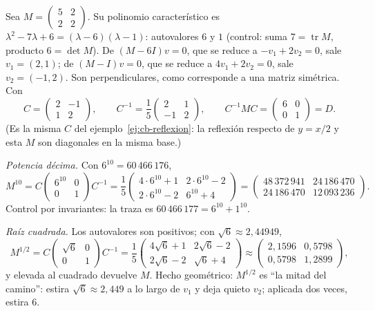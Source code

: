 \begin{ejemplo}\label{ej:cb-diagonalizar}
Sea \(M=\begin{pmatrix}5&2\\2&2\end{pmatrix}\). Su polinomio característico es
\(\lambda^2-7\lambda+6=(\lambda-6)(\lambda-1)\): autovalores \(6\) y \(1\) (control: suma
\(7=\operatorname{tr}M\), producto \(6=\det M\)). De \((M-6I)v=0\), que se reduce a
\(-v_1+2v_2=0\), sale \(v_1=(2,1)\); de \((M-I)v=0\), que se reduce a \(4v_1+2v_2=0\), sale
\(v_2=(-1,2)\). Son perpendiculares, como corresponde a una matriz simétrica. Con
\[
  C=\begin{pmatrix}2&-1\\1&2\end{pmatrix},\qquad
  C^{-1}=\frac15\begin{pmatrix}2&1\\-1&2\end{pmatrix},\qquad
  C^{-1}MC=\begin{pmatrix}6&0\\0&1\end{pmatrix}=D .
\]
(Es la misma \(C\) del ejemplo~\ref{ej:cb-reflexion}: la reflexión respecto de
\(y=x/2\) y esta \(M\) son diagonales en la misma base.)

\emph{Potencia décima.} Con \(6^{10}=60\,466\,176\),
\[
  M^{10}=C\begin{pmatrix}6^{10}&0\\0&1\end{pmatrix}C^{-1}
  =\frac15\begin{pmatrix}4\cdot6^{10}+1&2\cdot6^{10}-2\\2\cdot6^{10}-2&6^{10}+4\end{pmatrix}
  =\begin{pmatrix}48\,372\,941&24\,186\,470\\24\,186\,470&12\,093\,236\end{pmatrix}.
\]
Control por invariantes: la traza es \(60\,466\,177=6^{10}+1^{10}\).

\emph{Raíz cuadrada.} Los autovalores son positivos; con \(\sqrt6\approx2{,}44949\),
\[
  M^{1/2}=C\begin{pmatrix}\sqrt6&0\\0&1\end{pmatrix}C^{-1}
  =\frac15\begin{pmatrix}4\sqrt6+1&2\sqrt6-2\\2\sqrt6-2&\sqrt6+4\end{pmatrix}
  \approx\begin{pmatrix}2{,}1596&0{,}5798\\0{,}5798&1{,}2899\end{pmatrix},
\]
y elevada al cuadrado devuelve \(M\).
Hecho geométrico: \(M^{1/2}\) es \enquote{la mitad del camino}: estira \(\sqrt6\approx2{,}449\) a lo
largo de \(v_1\) y deja quieto \(v_2\); aplicada dos veces, estira \(6\).
\end{ejemplo}

